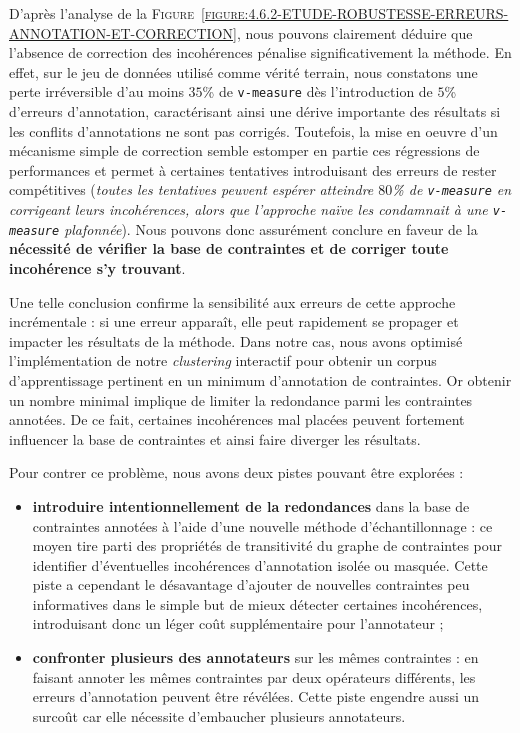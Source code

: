 			D'après l'analyse de la \textsc{Figure~\ref{figure:4.6.2-ETUDE-ROBUSTESSE-ERREURS-ANNOTATION-ET-CORRECTION}}, nous pouvons clairement déduire que l'absence de correction des incohérences pénalise significativement la méthode.
			En effet, sur le jeu de données utilisé comme vérité terrain, nous constatons une perte irréversible d'au moins $35$\% de \texttt{v-measure} dès l'introduction de $5$\% d'erreurs d'annotation, caractérisant ainsi une dérive importante des résultats si les conflits d'annotations ne sont pas corrigés.
			Toutefois, la mise en oeuvre d'un mécanisme simple de correction semble estomper en partie ces régressions de performances et permet à certaines tentatives introduisant des erreurs de rester compétitives
			(\textit{toutes les tentatives peuvent espérer atteindre $80$\% de \texttt{v-measure} en corrigeant leurs incohérences, alors que l'approche naïve les condamnait à une \texttt{v-measure} plafonnée}).
			Nous pouvons donc assurément conclure en faveur de la \textbf{nécessité de vérifier la base de contraintes et de corriger toute incohérence s'y trouvant}.
			
			Une telle conclusion confirme la sensibilité aux erreurs de cette approche incrémentale : si une erreur apparaît, elle peut rapidement se propager et impacter les résultats de la méthode.
			Dans notre cas, nous avons optimisé l'implémentation de notre \textit{clustering} interactif pour obtenir un corpus d'apprentissage pertinent en un minimum d'annotation de contraintes.
			Or obtenir un nombre minimal implique de limiter la redondance parmi les contraintes annotées.
			De ce fait, certaines incohérences mal placées peuvent fortement influencer la base de contraintes et ainsi faire diverger les résultats.
			
			Pour contrer ce problème, nous avons deux pistes pouvant être explorées :
			
			\begin{itemize}
				\item \textbf{introduire intentionnellement de la redondances} dans la base de contraintes annotées à l'aide d'une nouvelle méthode d'échantillonnage : ce moyen tire parti des propriétés de transitivité du graphe de contraintes pour identifier d'éventuelles incohérences d'annotation isolée ou masquée.
				Cette piste a cependant le désavantage d'ajouter de nouvelles contraintes peu informatives dans le simple but de mieux détecter certaines incohérences, introduisant donc un léger coût supplémentaire pour l'annotateur ;
				\item \textbf{confronter plusieurs des annotateurs} sur les mêmes contraintes : en faisant annoter les mêmes contraintes par deux opérateurs différents, les erreurs d'annotation peuvent être révélées.
				Cette piste engendre aussi un surcoût car elle nécessite d'embaucher plusieurs annotateurs.
			\end{itemize}
			

